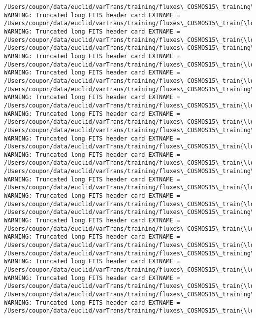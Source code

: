 \documentclass[11pt]{article}
\begin{document}
    \begin{Verbatim}[commandchars=\\\{\}]
/Users/coupon/data/euclid/varTrans/training/fluxes\_COSMOS15\_training\_0.fits
WARNING: Truncated long FITS header card EXTNAME = /Users/coupon/data/euclid/varTrans/training/fluxes\_COSMOS15\_train{\ldots}
WARNING: Truncated long FITS header card EXTNAME = /Users/coupon/data/euclid/varTrans/training/fluxes\_COSMOS15\_train{\ldots}
/Users/coupon/data/euclid/varTrans/training/fluxes\_COSMOS15\_training\_1.fits
WARNING: Truncated long FITS header card EXTNAME = /Users/coupon/data/euclid/varTrans/training/fluxes\_COSMOS15\_train{\ldots}
WARNING: Truncated long FITS header card EXTNAME = /Users/coupon/data/euclid/varTrans/training/fluxes\_COSMOS15\_train{\ldots}
/Users/coupon/data/euclid/varTrans/training/fluxes\_COSMOS15\_training\_2.fits
WARNING: Truncated long FITS header card EXTNAME = /Users/coupon/data/euclid/varTrans/training/fluxes\_COSMOS15\_train{\ldots}
WARNING: Truncated long FITS header card EXTNAME = /Users/coupon/data/euclid/varTrans/training/fluxes\_COSMOS15\_train{\ldots}
/Users/coupon/data/euclid/varTrans/training/fluxes\_COSMOS15\_training\_3.fits
WARNING: Truncated long FITS header card EXTNAME = /Users/coupon/data/euclid/varTrans/training/fluxes\_COSMOS15\_train{\ldots}
WARNING: Truncated long FITS header card EXTNAME = /Users/coupon/data/euclid/varTrans/training/fluxes\_COSMOS15\_train{\ldots}
/Users/coupon/data/euclid/varTrans/training/fluxes\_COSMOS15\_training\_4.fits
WARNING: Truncated long FITS header card EXTNAME = /Users/coupon/data/euclid/varTrans/training/fluxes\_COSMOS15\_train{\ldots}
WARNING: Truncated long FITS header card EXTNAME = /Users/coupon/data/euclid/varTrans/training/fluxes\_COSMOS15\_train{\ldots}
/Users/coupon/data/euclid/varTrans/training/fluxes\_COSMOS15\_training\_5.fits
WARNING: Truncated long FITS header card EXTNAME = /Users/coupon/data/euclid/varTrans/training/fluxes\_COSMOS15\_train{\ldots}
WARNING: Truncated long FITS header card EXTNAME = /Users/coupon/data/euclid/varTrans/training/fluxes\_COSMOS15\_train{\ldots}
/Users/coupon/data/euclid/varTrans/training/fluxes\_COSMOS15\_training\_6.fits
WARNING: Truncated long FITS header card EXTNAME = /Users/coupon/data/euclid/varTrans/training/fluxes\_COSMOS15\_train{\ldots}
WARNING: Truncated long FITS header card EXTNAME = /Users/coupon/data/euclid/varTrans/training/fluxes\_COSMOS15\_train{\ldots}
/Users/coupon/data/euclid/varTrans/training/fluxes\_COSMOS15\_training\_7.fits
WARNING: Truncated long FITS header card EXTNAME = /Users/coupon/data/euclid/varTrans/training/fluxes\_COSMOS15\_train{\ldots}

\end{Verbatim}
\end{document}
